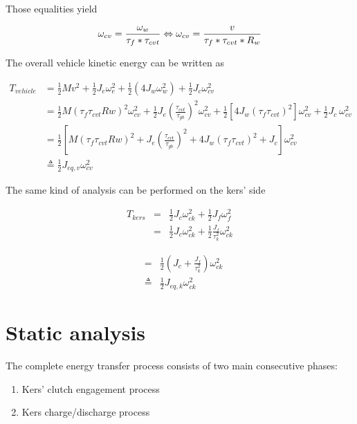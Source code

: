 \documentclass[11pt]{article}
\begin{document}
Those equalities yield

\begin{equation}
\omega_{cv}=\frac{\omega_w}{\tau_f*\tau_{cvt}} \Leftrightarrow \omega_{cv}=\frac{v}{\tau_f*\tau_{cvt}*R_w}\\
\end{equation}
\vspace{1mm}

The overall vehicle kinetic energy can be written as

\begin{align}
T_{vehicle}&=\frac{1}{2}Mv^2+\frac{1}{2}J_e\omega_e^2+ \frac{1}{2}(4J_w\omega_w^2)+\frac{1}{2}J_c\omega_{cv}^2 \\
	 &=\frac{1}{2}M(\tau_f\tau_{cvt}Rw)^2\omega_{cv}^2+\frac{1}{2}J_e\left(\frac{\tau_{cvt}}{\tau_{gb}}\right)^2\omega_{cv}^2+\frac{1}{2}\left[4J_w\left(\tau_f \tau_{cvt}\right)^2\right]\omega_{cv}^2+\frac{1}{2}J_c\ \omega_{cv}^2\\
	 &=\frac{1}{2}\left[M(\tau_f\tau_{cvt}Rw)^2+J_e\left(\frac{\tau_{cvt}}{\tau_{gb}}\right)^2+4J_w\left(\tau_f \tau_{cvt}\right)^2+J_c\right] \omega_{cv}^2\\
	 & \triangleq \frac{1}{2}J_{eq,v}\omega_{cv}^2 
\end{align}
\vspace{1mm}

The same kind of analysis can be performed on the kers' side

\begin{eqnarray}
	T_{kers}&=&\frac{1}{2}J_c\omega_{ck}^2+\frac{1}{2}J_f\omega_f^2\\
	&=&\frac{1}{2}J_c\omega_{ck}^2+\frac{1}{2}\frac{J_f}{\tau_k^2}\omega_{ck}^2
\end{eqnarray}

\begin{eqnarray}
	&=&\frac{1}{2}\left(J_c+\frac{J_f}{\tau_k^2}\right)\omega_{ck}^2\\
	&\triangleq & \frac{1}{2}J_{eq,k}\omega_{ck}^2
\end{eqnarray}

\section{Static analysis}

The complete energy transfer process consists of two main consecutive phases:

\begin{enumerate}
\item Kers' clutch engagement process
\item Kers charge/discharge process
\end{enumerate}
\end{document}
